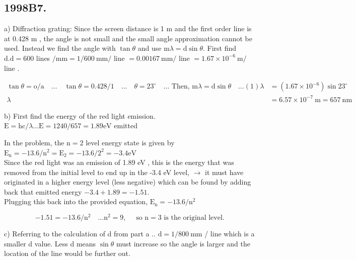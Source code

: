\begin{enumerate}
\section*{1998B7.}
a) Diffraction grating: Since the screen distance is 1 m and the first order line is at 0.428 m , the angle is not small and the small angle approximation cannot be used. Instead we find the angle with $\tan \theta$ and use $\mathrm{m} \lambda=\mathrm{d} \sin \theta$. First find $\mathrm{d} . \mathrm{d}=600$ lines $/ \mathrm{mm}=1 / 600 \mathrm{~mm} /$ line $=0.00167 \mathrm{~mm} /$ line $=1.67 \times 10^{-6} \mathrm{~m} /$ line .

$$
\begin{array}{rlllll}
\tan \theta=\mathrm{o} / \mathrm{a} \quad \ldots \quad \tan \theta=0.428 / 1 \quad \ldots \quad \theta=23^{\circ} \quad \ldots \text { Then, } \mathrm{m} \lambda=\mathrm{d} \sin \theta \quad \ldots(1) \lambda & =\left(1.67 \times 10^{-6}\right) \sin 23^{\circ} \\
\lambda & =6.57 \times 10^{-7} \mathrm{~m}=657 \mathrm{~nm}
\end{array}
$$

b) First find the energy of the red light emission. $\mathrm{E}=\mathrm{hc} / \lambda \ldots \mathrm{E}=1240 / 657=1.89 \mathrm{eV}$ emitted

In the problem, the $\mathrm{n}=2$ level energy state is given by $\mathrm{E}_{\mathrm{n}}=-13.6 / \mathrm{n}^{2}=\mathrm{E}_{2}=-13.6 / 2^{2}=-3.4 \mathrm{eV}$\\
Since the red light was an emission of 1.89 eV , this is the energy that was removed from the initial level to end up in the -3.4 eV level, $\rightarrow$ it must have originated in a higher energy level (less negative) which can be found by adding back that emitted energy $-3.4+1.89=-1.51$.\\
Plugging this back into the provided equation, $\mathrm{E}_{\mathrm{n}}=-13.6 / \mathrm{n}^{2}$

$$
-1.51=-13.6 / \mathrm{n}^{2} \quad \ldots \mathrm{n}^{2}=9, \quad \text { so } \mathrm{n}=3 \text { is the original level. }
$$

c) Referring to the calculation of d from part a .. $\mathrm{d}=1 / 800 \mathrm{~mm}$ / line which is a smaller d value. Less d means $\sin \theta$ must increase so the angle is larger and the location of the line would be further out.


\end{enumerate}
